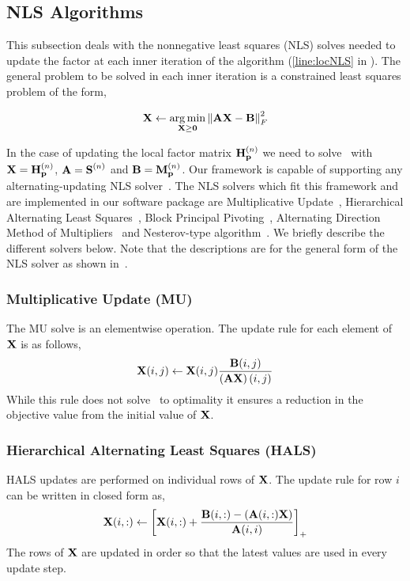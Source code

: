 \subsection{NLS Algorithms}
This subsection deals with the nonnegative least squares (NLS) solves needed to update the factor at each inner iteration of the algorithm (\cref{line:locNLS} in ). The general problem to be solved in each inner iteration is a constrained least squares problem of the form,

\begin{align}
\M{X} \leftarrow \underset{\M{X} \ge \M{0}}{\argmin} \left\lVert \M{A}\M{X} -\M{B}\right\rVert^2_F
\label{eqn:nls}
\end{align}

In the case of updating the local factor matrix $\Mn{H}{n}_{\V{p}}$ we need to solve~ with $\M{X} = \Mn{H}{n}_{\V{p}}$, $\M{A} = \Mn{S}{n}$ and $\M{B} = \Mn{M}{n}_{\V{p}}$. Our framework is capable of supporting any alternating-updating NLS solver~\cite{KBP16}. The NLS solvers which fit this framework and are implemented in our software package are Multiplicative Update~\cite{LS99}, Hierarchical Alternating Least Squares~\cite{CP2009}, Block Principal Pivoting~\cite{KP2011}, Alternating Direction Method of Multipliers~\cite{HSL2016} and Nesterov-type algorithm~\cite{LKLHS2017}. We briefly describe the different solvers below. Note that the descriptions are for the general form of the NLS solver as shown in~.


\subsubsection{Multiplicative Update (MU)}
The MU solve is an elementwise operation. The update rule for each element of $\M{X}$ is as follows,
\begin{align}
\M{X}(i,j) \leftarrow \M{X}(i,j)\frac{\M{B}(i,j)}{\left(\M{A}\M{X}\right)(i,j)}
\end{align}
While this rule does not solve~ to optimality it ensures a reduction in the objective value from the initial value of $\M{X}$.

\subsubsection{Hierarchical Alternating Least Squares (HALS)}
HALS updates are performed on individual rows of $\M{X}$. The update rule for row $i$ can be written in closed form as,
\begin{align}
\M{X}(i,:) \leftarrow \left[ \M{X}(i,:) + \frac{\M{B}(i,:) - \left(\M{A}(i,:)\M{X}\right)}{\M{A}(i,i)} \right]_+
\end{align}
The rows of $\M{X}$ are updated in order so that the latest values are used in every update step.


